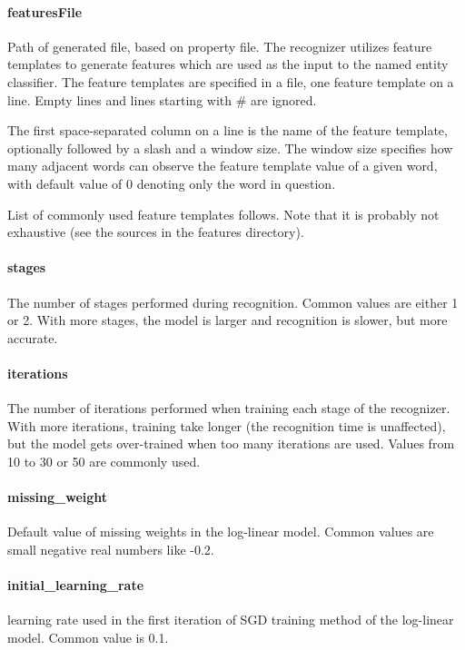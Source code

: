 \paragraph{featuresFile}
Path of generated file, based on property file.
The recognizer utilizes feature templates to generate features which are used as
the input to the named entity classifier. The feature templates are specified in
a file, one feature template on a line. Empty lines and lines starting with \# are ignored.

The first space-separated column on a line is the name of the feature template,
optionally followed by a slash and a window size. The window size specifies how
many adjacent words can observe the feature template value of a given word, with
default value of 0 denoting only the word in question.

List of commonly used feature templates follows. Note that it is probably not
exhaustive (see the sources in the features directory).


\paragraph{stages}
The number of stages performed during recognition. Common values are either 1 or
2. With more stages, the model is larger and recognition is slower, but more accurate.

\paragraph{iterations}
The number of iterations performed when training each stage of the recognizer.
With more iterations, training take longer (the recognition time is unaffected),
but the model gets over-trained when too many iterations are used. Values from 10
to 30 or 50 are commonly used.

\paragraph{missing\_weight}
Default value of missing weights in the log-linear model. Common values are small
negative real numbers like -0.2.

\paragraph{initial\_learning\_rate}
learning rate used in the first iteration of SGD training method of the log-linear
model. Common value is 0.1.

